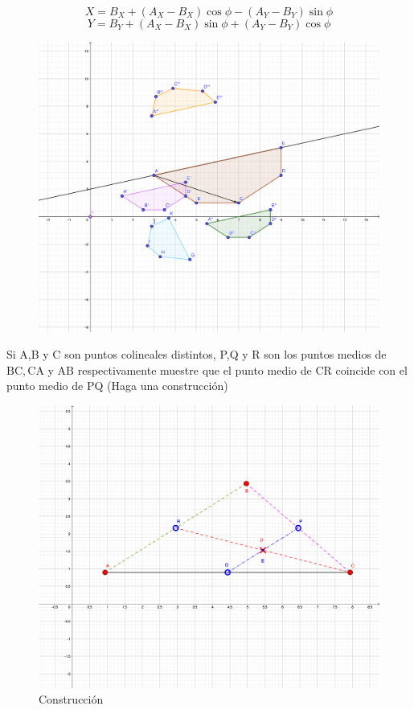 \begin{sol}
$$X = B_X + (A_X-B_X)\cos\phi  - (A_Y-B_Y)\sin \phi $$
$$Y = B_Y + (A_X-B_X)\sin\phi  + (A_Y-B_Y)\cos \phi $$
	\begin{figure}[H]
		\centering
		\includegraphics[scale=1]{Images/P3-1.png}
	\end{figure}

\end{sol}
\begin{problema}
	Si A,B y C son puntos colineales distintos, P,Q y R son los puntos medios de $\mathrm{BC}, \mathrm{CA}$ y $\mathrm{AB}$ respectivamente muestre que el punto medio de CR coincide con el punto medio de PQ (Haga una construcción)
\end{problema}
	\begin{figure}[H]
	\centering
	\includegraphics[scale=1]{Images/P4.png}
	\caption{Construcción}
\end{figure}
